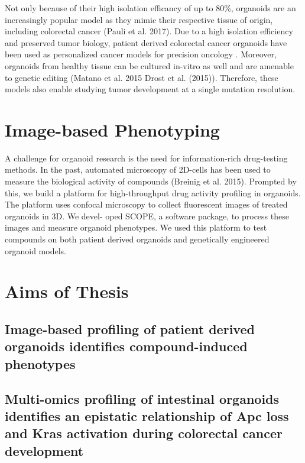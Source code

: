 \begin{flushleft}
Not only because of their high isolation efficancy of up to 80\%, organoids are an increasingly popular model as they mimic their respective tissue of origin, including colorectal cancer (Pauli et al. 2017). Due to a high isolation efficiency and preserved tumor biology, patient derived colorectal cancer organoids have been used as personalized cancer models for precision oncology \cite{VanDeWetering2015, Vlachogiannis2018}. Moreover, organoids from healthy tissue can be cultured in-vitro as well and are amenable to genetic editing (Matano et al. 2015 Drost et al. (2015)). Therefore, these models also enable studying tumor development at a single mutation resolution.

\section{Image-based Phenotyping}
A challenge for organoid research is the need for information-rich drug-testing methods. In the past, automated microscopy of 2D-cells has been used to measure the biological activity of compounds (Breinig et al. 2015). Prompted by this, we build a platform for high-throughput drug activity profiling in organoids. The platform uses confocal microscopy to collect fluorescent images of treated organoids in 3D. We devel- oped SCOPE, a software package, to process these images and measure organoid phenotypes. We used this platform to test compounds on both patient derived organoids and genetically engineered organoid models.

\section{Aims of Thesis}
\subsection{Image-based profiling of patient derived organoids identifies compound-induced phenotypes}
\subsection{Multi-omics profiling of intestinal organoids identifies an epistatic relationship of Apc loss and Kras activation during colorectal cancer development}
\end{flushleft}



